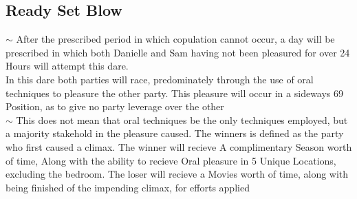\subsection{Ready Set Blow}
\begin{samepage}
\indent $\sim$ After the prescribed period in which copulation cannot occur, a day will be prescribed in which both 
	Danielle and Sam having not been pleasured for over 24 Hours will attempt this dare. \\
	In this dare both parties will race, predominately through the use of oral techniques to pleasure the other party. 
	This pleasure will occur in a sideways 69 Position, as to give no party leverage over the other \\
	\indent $\sim$ \hspace{5mm} This does not mean that oral techniques be the only techniques employed, but a majority stakehold
	in the pleasure caused.
	The winners is defined as the party who first caused a climax. The winner will recieve A complimentary Season worth of time,
	Along with the ability to recieve Oral pleasure in 5 Unique Locations, excluding the bedroom.
	The loser will recieve a Movies worth of time, along with being finished of the impending climax, for efforts applied
	
\end{samepage}
